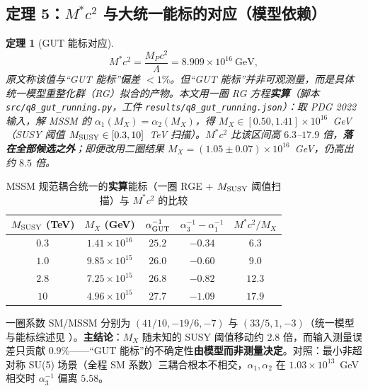 \documentclass[12pt,a4paper]{article}
\newtheorem{theorem}{定理}
\begin{document}
\subsection{定理 5：$M^*c^2$ 与大统一能标的对应（模型依赖）}

\begin{theorem}[GUT 能标对应]
\begin{equation}
  M^* c^2 = \frac{M_P c^2}{\Lambda} = 8.909\times10^{16}~\text{GeV},
\end{equation}
原文称该值与“GUT 能标”偏差 $< 1\%$。但“GUT 能标”并非可观测量，而是具体统一模型重整化群（RG）拟合的产物。本文用一圈 RG 方程\textbf{实算}（脚本 \texttt{src/q8\_\allowbreak{}gut\_\allowbreak{}running.py}，工件 \texttt{results/q8\_\allowbreak{}gut\_\allowbreak{}running.json}）：取 PDG 2022 输入，解 MSSM 的 $\alpha_1(M_X)=\alpha_2(M_X)$，得 $M_X \in [0.50,1.41]\times10^{16}$~GeV（SUSY 阈值 $M_{\rm SUSY}\in[0.3,10]$~TeV 扫描）。$M^*c^2$ 比该区间高 $6.3$--$17.9$ 倍，\textbf{落在全部候选之外}；即便改用二圈结果 $M_X=(1.05\pm0.07)\times10^{16}$~GeV\cite{bourilkov2015}，仍高出约 $8.5$ 倍。
\end{theorem}

\begin{table}[h]
\centering
\caption{MSSM 规范耦合统一的\textbf{实算}能标（一圈 RGE + $M_{\rm SUSY}$ 阈值扫描）与 $M^*c^2$ 的比较}
\label{tab:gut}
\footnotesize
\begin{tabular}{@{}ccccc@{}}
\toprule
$M_{\rm SUSY}$ (TeV) & $M_X$ (GeV) & $\alpha_{\rm GUT}^{-1}$ & $\alpha_3^{-1}\!-\!\alpha_1^{-1}$ & $M^*c^2/M_X$ \\
\midrule
$0.3$ & $1.41\times10^{16}$ & $25.2$ & $-0.34$ & $6.3$ \\
$1.0$ & $9.85\times10^{15}$ & $26.0$ & $-0.60$ & $9.0$ \\
$2.8$ & $7.25\times10^{15}$ & $26.8$ & $-0.82$ & $12.3$ \\
$10$ & $4.96\times10^{15}$ & $27.7$ & $-1.09$ & $17.9$ \\
\bottomrule
\end{tabular}
\end{table}

\noindent 一圈系数 SM/MSSM 分别为 $(41/10,-19/6,-7)$ 与 $(33/5,1,-3)$（统一模型与能标综述见 \cite{nath2007}）。\textbf{主结论}：$M_X$ 随未知的 SUSY 阈值移动约 $2.8$ 倍，而输入测量误差只贡献 $0.9\%$——“GUT 能标”的不确定性\textbf{由模型而非测量决定}。对照：最小非超对称 SU(5) 场景（全程 SM 系数）三耦合根本不相交，$\alpha_1,\alpha_2$ 在 $1.03\times10^{13}$~GeV 相交时 $\alpha_3^{-1}$ 偏离 $5.58$。\par\medskip
\end{document}

